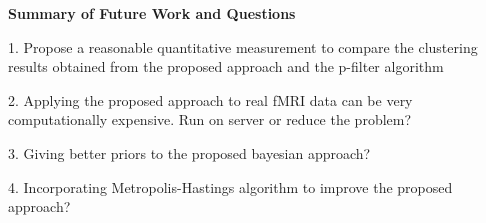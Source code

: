 \documentclass[12pt]{article}
\begin{document}
\vspace{1em}
{\bf Summary of Future Work and Questions}

1. Propose a reasonable quantitative measurement to compare the clustering results obtained from the proposed approach and the p-filter algorithm 

2. Applying the proposed approach to real fMRI data can be very computationally expensive. Run on server or reduce the problem?

3. Giving better priors to the proposed bayesian approach?

4. Incorporating Metropolis-Hastings algorithm to improve the proposed approach?



\end{document}
